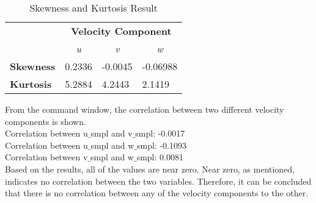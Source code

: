 \documentclass[11pt]{article}
\begin{document}
\begin{table}[ht]
\centering
\caption{Skewness and Kurtosis Result}
\label{tab:SkewnessKurt}
\begin{tabular}{@{}llll@{}}
\toprule
 & \multicolumn{3}{c}{\textbf{Velocity Component}} \\
 & \multicolumn{1}{c}{\textit{u}} & \multicolumn{1}{c}{\textit{v}} & \multicolumn{1}{c}{\textit{w}} \\ \midrule
\textbf{Skewness} & 0.2336 & -0.0045 & -0.06988 \\
\textbf{Kurtosis} & 5.2884 & 4.2443 & 2.1419 \\ \bottomrule
\end{tabular}
\end{table}
\noindent From the command window, the correlation between two different velocity components is shown.\\
\newline
{\ubuntumono Correlation between u$\_$smpl and v$\_$smpl: -0.0017  \\  
Correlation between u$\_$smpl and w$\_$smpl: -0.1093 \\
Correlation between v$\_$smpl and w$\_$smpl:   0.0081\\}
\newline Based on the results, all of the values are near zero. Near zero, as \citet{BMJ2023} mentioned, indicates no correlation between the two variables. Therefore, it can be concluded that there is no correlation between any of the velocity components to the other.
\end{document}
